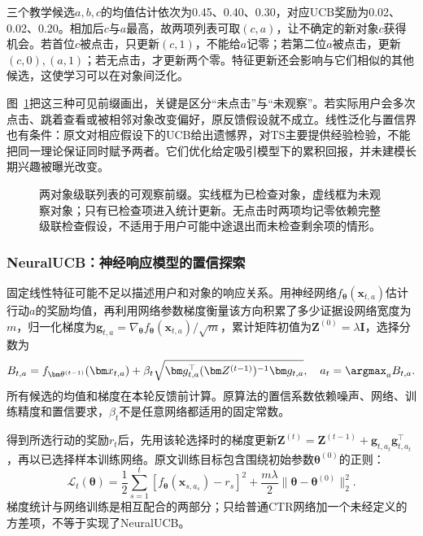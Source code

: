 三个教学候选$a,b,c$的均值估计依次为0.45、0.40、0.30，对应UCB奖励为0.02、0.02、0.20。相加后$c$与$a$最高，故两项列表可取$(c,a)$，让不确定的新对象$c$获得机会。若首位$c$被点击，只更新$(c,1)$，不能给$a$记零；若第二位$a$被点击，更新$(c,0),(a,1)$；若无点击，才更新两个零。特征更新还会影响与它们相似的其他候选，这使学习可以在对象间泛化。

图~\ref{fig:rs-cascade-feedback}把这三种可见前缀画出，关键是区分“未点击”与“未观察”。若实际用户会多次点击、跳着查看或被相邻对象改变偏好，原反馈假设就不成立。线性泛化与置信界也有条件：原文对相应假设下的UCB给出遗憾界，对TS主要提供经验检验，不能把同一理论保证同时赋予两者。它们优化给定吸引模型下的累积回报，并未建模长期兴趣被曝光改变。

\begin{figure}[htbp]
 \centering
 
 \caption{两对象级联列表的可观察前缀。实线框为已检查对象，虚线框为未观察对象；只有已检查项进入统计更新。无点击时两项均记零依赖完整级联检查假设，不适用于用户可能中途退出而未检查剩余项的情形。}
 \label{fig:rs-cascade-feedback}
\end{figure}

\subsubsection{NeuralUCB：神经响应模型的置信探索}
\label{sec:rs-neuralucb}

固定线性特征可能不足以描述用户和对象的响应关系。用神经网络$f_{\bm\theta}(\bm x_{t,a})$估计行动$a$的奖励均值，再利用网络参数梯度衡量该方向积累了多少证据设网络宽度为$m$，归一化梯度为$\bm g_{t,a}=\nabla_{\bm\theta}f_{\bm\theta}(\bm x_{t,a})/\sqrt m$，累计矩阵初值为$\bm Z^{(0)}=\lambda\bm I$，选择分数为
\begin{equation}
 B_{t,a}=f_{\bm\theta^{(t-1)}}(\bm x_{t,a})
          +\beta_t\sqrt{\bm g_{t,a}^\top
                      (\bm Z^{(t-1)})^{-1}\bm g_{t,a}},
 \quad a_t=\argmax_a B_{t,a}.
 \label{eq:rs-neuralucb}
\end{equation}
所有候选的均值和梯度在本轮反馈前计算。原算法的置信系数依赖噪声、网络、训练精度和置信要求，$\beta_t$不是任意网络都适用的固定常数。

得到所选行动的奖励$r_t$后，先用该轮选择时的梯度更新$\bm Z^{(t)}=\bm Z^{(t-1)}+\bm g_{t,a_t}\bm g_{t,a_t}^\top$，再以已选择样本训练网络。原文训练目标包含围绕初始参数$\bm\theta^{(0)}$的正则：
\begin{equation}
 \mathcal L_t(\bm\theta)=
 \frac12\sum_{s=1}^{t}
       [f_{\bm\theta}(\bm x_{s,a_s})-r_s]^2
 +\frac{m\lambda}{2}
       \lVert\bm\theta-\bm\theta^{(0)}\rVert_2^2.
 \label{eq:rs-neuralucb-train}
\end{equation}
梯度统计与网络训练是相互配合的两部分；只给普通CTR网络加一个未经定义的方差项，不等于实现了NeuralUCB。

